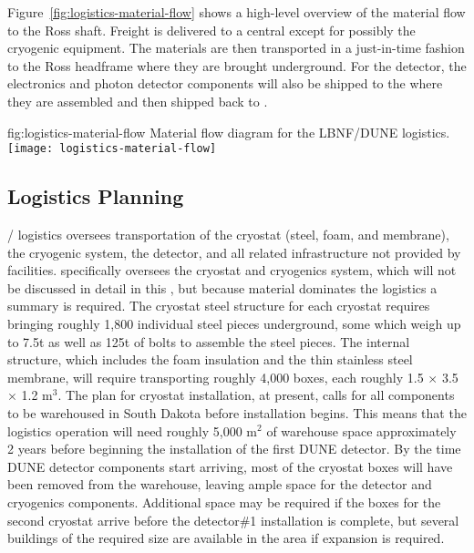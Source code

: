 Figure~\ref{fig:logistics-material-flow} shows a high-level overview of the material flow to the Ross shaft. Freight is delivered to a central  except for possibly the cryogenic equipment. 
 The materials are then transported in a just-in-time fashion to the Ross headframe where they are brought underground. For the detector, the  electronics and photon detector components will also be shipped to the  where they are assembled and then shipped back to .
 
\begin{dunefigure}{fig:logistics-material-flow}
  {Material flow diagram for the LBNF/DUNE logistics.}
 \texttt{[image: logistics-material-flow]}
\end{dunefigure}


\subsection{Logistics Planning}
\label{sec:fdsp-tc-logPln}
/ logistics oversees transportation of the cryostat (steel, foam, and membrane), the cryogenic system, the detector, and all related infrastructure not provided by facilities.  specifically oversees the cryostat and cryogenics system, which will not be discussed in detail in this , but because  material dominates the logistics a summary is required. The cryostat steel structure for each cryostat requires bringing roughly 1,800 individual steel pieces underground, some which weigh up to 7.5t as well as 125t of bolts to assemble the steel pieces. The internal structure, which includes the foam insulation and the thin stainless steel membrane, will require transporting roughly 4,000 boxes, each roughly 1.5 $\times$ 3.5 $\times$ 1.2 m$^3$. The plan for cryostat installation, at present, calls for all components to be warehoused in South Dakota before installation begins. This means that the logistics operation will need roughly 5,000 m$^2$ of warehouse space approximately 2 years before beginning the installation of the first DUNE detector. By the time DUNE detector components start arriving, most of the cryostat boxes will have been removed from the warehouse, leaving ample space for the detector and cryogenics components. Additional space may be required if the boxes for the second cryostat arrive before the detector\#1 installation is complete, but several buildings of the required size are available in the area if expansion is required.


